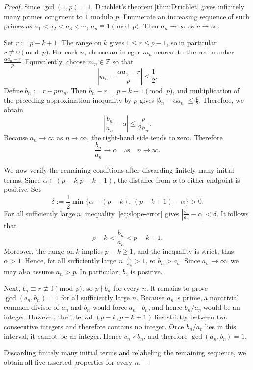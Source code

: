 \documentclass[reqno, 12pt]{article}
\numberwithin{equation}{section}
\theoremstyle{definition}
\newcommand{\ZZ}{\mathbb{Z}}
\begin{document}
\begin{proof}
Since $\gcd(1,p)=1$, Dirichlet's theorem \ref{thm:Dirichlet} gives infinitely many primes
congruent to $1$ modulo $p$.  Enumerate an increasing sequence of such primes
as $a_1<a_2<a_3<\cdots$, $a_n\equiv1\pmod p$. 
Then $a_n\to\infty$ as $n\to \infty$.

Set $r:=p-k+1$.
The range on $k$ gives $1\le r\le p-1$,
so in particular $r\not\equiv0\pmod p$.  For each $n$, choose an integer
$m_n$ nearest to the real number $\frac{\alpha a_n-r}{p}$.
Equivalently, choose $m_n\in\ZZ$ so that
\[
  \left|m_n-\frac{\alpha a_n-r}{p}\right|\le\frac12.
\]
Define $b_n:=r+pm_n$. Then $b_n\equiv r=p-k+1\pmod p$,
and multiplication of the preceding approximation inequality by $p$ gives $|b_n-\alpha a_n|\le\frac{p}{2}$.
Therefore, we obtain
\begin{equation}\label{eq:slope-error}
  \left|\frac{b_n}{a_n}-\alpha\right| \le\frac{p}{2a_n}.
\end{equation}
Because $a_n\to\infty$ as $n\to \infty$, the right-hand side tends to zero.  Therefore
\[ \frac{b_n}{a_n}\longrightarrow\alpha \quad \text{as}\quad  n\to \infty.
\]

We now verify the remaining conditions after discarding finitely many initial
terms. Since $\alpha\in(p-k,p-k+1)$, the distance from $\alpha$ to either endpoint is positive.  Set
\[\delta:=\frac12\min\{\alpha-(p-k),\,(p-k+1)-\alpha\}>0. \]
For all sufficiently large $n$, inequality~\cref{eq:slope-error} gives $\left|\frac{b_n}{a_n}-\alpha\right|<\delta$.
It follows that
\[
  p-k<\frac{b_n}{a_n}<p-k+1.
\]
Moreover, the range on $k$ implies $p-k\ge1$, and the inequality is strict;
thus $\alpha>1$.  Hence, for all sufficiently large $n$, $\frac{b_n}{a_n}>1$,
so $b_n>a_n$.  Since $a_n\to\infty$, we may also assume $a_n>p$.  In
particular, $b_n$ is positive.

Next, $b_n\equiv r\not\equiv0\pmod p$, so $p\nmid b_n$ for every $n$.
It remains to prove $\gcd(a_n,b_n)=1$ for all sufficiently large $n$.
Because $a_n$ is prime, a nontrivial common divisor of $a_n$ and $b_n$ would force $a_n\mid b_n$, and hence $b_n/a_n$ would be an integer.  However, the interval $(p-k,p-k+1)$ lies strictly between two consecutive integers and therefore contains no integer.  Once $b_n/a_n$ lies in this interval, it cannot be an integer.  Hence $a_n\nmid b_n$, and therefore $\gcd(a_n,b_n)=1$.

Discarding finitely many initial terms and relabeling the remaining sequence,
we obtain all five asserted properties for every $n$.
\end{proof}
\end{document}
